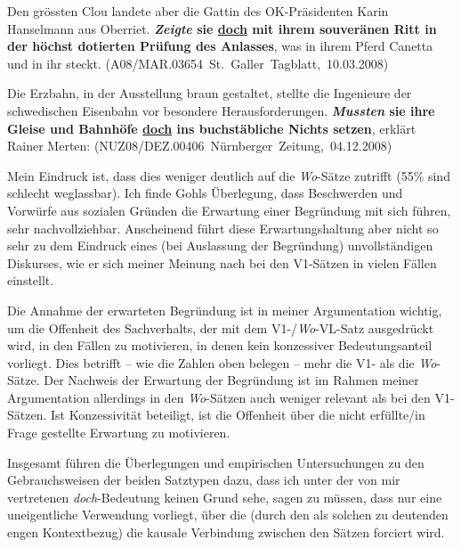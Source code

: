 {\begin{exe}
	\ex\label{1052} 
	\scriptsize
	Den grössten Clou landete aber die Gattin des OK-Präsidenten Karin Hanselmann aus Oberriet. \textbf{\textit{Zeigte} sie \underline{doch} mit ihrem 			souveränen Ritt in der höchst dotierten Prüfung des Anlasses}, was in ihrem Pferd Canetta und in ihr steckt.                      
	\hfill\hbox {(A08/MAR.03654 St. Galler Tagblatt, 10.03.2008)}
\end{exe}	                                     

\begin{exe}
	\ex\label{1053} 
	\scriptsize
	Die Erzbahn, in der Ausstellung braun gestaltet, stellte die Ingenieure der schwedischen Eisenbahn vor besondere Herausforderungen. 						\textbf{\textit{Mussten} sie ihre Gleise und Bahnhöfe \underline{doch} ins \glqq buchstäbliche Nichts\grqq{} setzen}, erklärt Rainer Merten:                     
	\hfill\hbox {(NUZ08/DEZ.00406 Nürnberger Zeitung, 04.12.2008)}
\end{exe}
Mein Eindruck ist, dass dies weniger deutlich auf die \textit{Wo}-Sätze zutrifft (55\% sind schlecht weglassbar). Ich finde Gohls Überlegung, dass Beschwerden und Vorwürfe aus sozialen Gründen die Erwartung einer Begründung mit sich führen, sehr nachvollziehbar. Anscheinend führt diese Erwartungshaltung aber nicht so sehr zu dem Eindruck eines (bei Auslassung der Begründung) unvollständigen Diskurses, wie er sich meiner Meinung nach bei den V1-Sätzen in vielen Fällen einstellt.

Die Annahme der erwarteten Begründung ist in meiner Argumentation wichtig, um die Offenheit des Sachverhalts, der mit dem V1-/\textit{Wo}-VL-Satz ausgedrückt wird, in den Fällen zu motivieren, in denen kein konzessiver Bedeutungsanteil vorliegt. Dies betrifft – wie die Zahlen oben belegen – mehr die V1- als die \textit{Wo}-Sätze. Der Nachweis der Erwartung der Begründung ist im Rahmen meiner Argumentation allerdings in den \textit{Wo}-Sätzen auch weniger relevant als bei den V1-Sätzen. Ist Konzessivität beteiligt, ist die Offenheit über die nicht erfüllte/in Frage gestellte Erwartung zu motivieren. 

Insgesamt führen die Überlegungen und empirischen Untersuchungen zu den Gebrauchsweisen der beiden Satztypen dazu, dass ich unter der von mir vertretenen \textit{doch}-Bedeutung keinen Grund sehe, sagen zu müssen, dass nur eine uneigentliche Verwendung vorliegt, über die (durch den als solchen zu deutenden engen Kontextbezug) die kausale Verbindung zwischen den Sätzen forciert wird.

}
